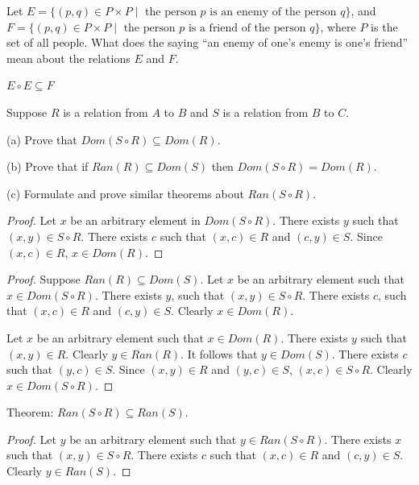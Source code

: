 \begin{tcolorbox}[title=Problem 8, breakable]
    Let $E = \{(p, q) \in P \times P \mid \text{ the person $p$ is an enemy of the person $q$}\}$,
    and $F = \{(p, q) \in P \times P \mid \text{ the person $p$ is a friend of the person $q$}\}$,
    where $P$ is the set of all people. What does the saying ``an enemy of one's enemy is one's friend''
    mean about the relations $E$ and $F$.
\end{tcolorbox}

$E \circ E \subseteq F$

\begin{tcolorbox}[title=Problem 9, breakable]
    Suppose $R$ is a relation from $A$ to $B$ and $S$ is a relation from $B$ to $C$.

    (a) Prove that $Dom(S \circ R) \subseteq Dom(R)$.

    (b) Prove that if $Ran(R) \subseteq Dom(S)$ then $Dom(S \circ R)  = Dom(R)$.

    (c) Formulate and prove similar theorems about $Ran(S \circ R)$.
\end{tcolorbox}

\begin{proof}
    Let $x$ be an arbitrary element in $Dom(S \circ R)$.
    There exists $y$ such that $(x, y) \in S \circ R$.
    There exists $c$ such that $(x, c) \in R$ and $(c, y) \in S$.
    Since $(x, c) \in R$, $x \in Dom(R)$.
\end{proof}

\begin{proof}
    Suppose $Ran(R) \subseteq Dom(S)$.
    Let $x$ be an arbitrary element such that $x \in Dom(S \circ R)$.
    There exists $y$, such that $(x, y) \in S \circ R$.
    There exists $c$, such that $(x, c) \in R$ and $(c, y) \in S$.
    Clearly $x \in Dom(R)$.

    Let $x$ be an arbitrary element such that $x \in Dom(R)$. There exists $y$ such
    that $(x, y) \in R$. Clearly $y \in Ran(R)$. It follows that $y \in Dom(S)$.
    There exists $c$ such that $(y, c) \in S$. Since $(x, y) \in R$ and $(y, c) \in
        S$, $(x, c) \in S \circ R$. Clearly $x \in Dom(S \circ R)$.
\end{proof}

Theorem: $Ran(S \circ R) \subseteq Ran(S)$.

\begin{proof}
    Let $y$ be an arbitrary element such that $y \in Ran(S \circ R)$.
    There exists $x$ such that $(x, y) \in S \circ R$.
    There exists $c$ such that $(x, c) \in R$ and $(c, y) \in S$.
    Clearly $y \in Ran(S)$.
\end{proof}

